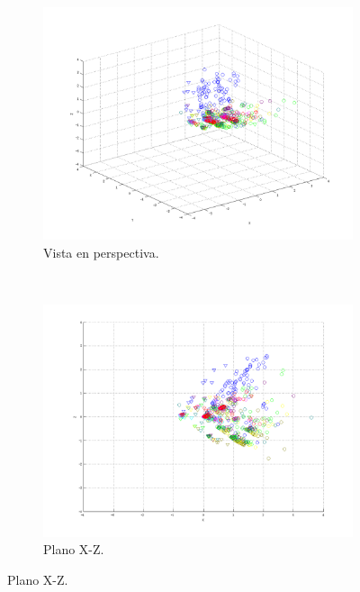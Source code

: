 \documentclass[informe.tex]{subfiles}
\begin{document}
	\begin{figure}[H]
        \centering
        \hspace*{-6.5cm}
        \begin{subfigure}[b]{0.49\textwidth}
                \includegraphics[width=\textwidth]{graficos/fold1_criterioParadap_reglaM_alpha0_rep2_0P.png}
                \caption{Vista en perspectiva.}
        \end{subfigure}%
        ~
        \begin{subfigure}[b]{0.49\textwidth}
                \includegraphics[width=\textwidth]{graficos/fold1_criterioParadap_reglaM_alpha0_rep2_1XZ.png}
                \caption{Plano X-Z.}
        \end{subfigure}
        

\end{figure}
\end{document}

